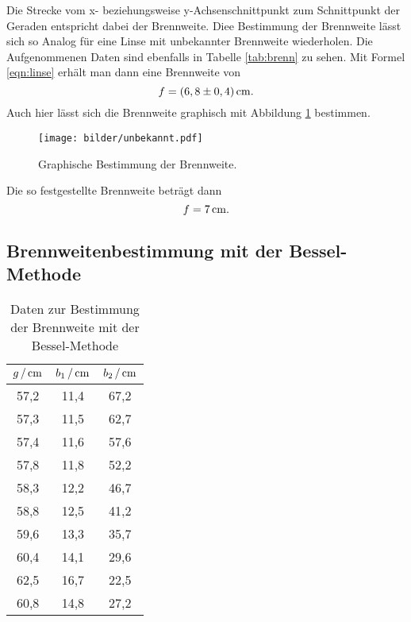Die Strecke vom x- beziehungsweise y-Achsenschnittpunkt zum Schnittpunkt der Geraden
entspricht dabei der Brennweite.
Diee Bestimmung der Brennweite lässt sich so Analog für eine Linse mit unbekannter
Brennweite wiederholen. Die Aufgenommenen Daten sind ebenfalls in Tabelle \ref{tab:brenn}
zu sehen. Mit Formel \eqref{eqn:linse} erhält man dann eine Brennweite von
\begin{equation*}
  f= (6,8 \pm 0,4) \,\si{\centi\meter}.
\end{equation*}
Auch hier lässt sich die Brennweite graphisch mit Abbildung \ref{fig:unb}
bestimmen.
\begin{figure}
  \centering
  \texttt{[image: bilder/unbekannt.pdf]}
  \caption{Graphische Bestimmung der Brennweite.}
  \label{fig:unb}
\end{figure}
Die so festgestellte Brennweite beträgt dann
\begin{equation*}
  f = 7\,\si{\centi\meter}.
\end{equation*}
\subsection{Brennweitenbestimmung mit der Bessel-Methode}

\begin{table}[H]
  \centering
  \caption{Daten zur Bestimmung der Brennweite mit der Bessel-Methode}
  \label{tab:bessel}
  \begin{tabular}{ccc}
    \toprule
    $g\,/\,\si{\centi\meter}$ & $b_1\,/\,\si{\centi\meter}$ & $b_2\,/\,\si{\centi\meter}$ \\
    \midrule
    57,2 & 11,4 & 67,2 \\
    57,3 & 11,5 & 62,7 \\
    57,4 & 11,6 & 57,6 \\
    57,8 & 11,8 & 52,2 \\
    58,3 & 12,2 & 46,7 \\
    58,8 & 12,5 & 41,2 \\
    59,6 & 13,3 & 35,7 \\
    60,4 & 14,1 & 29,6 \\
    62,5 & 16,7 & 22,5 \\
    60,8 & 14,8 & 27,2 \\
    \bottomrule
  \end{tabular}
\end{table}

